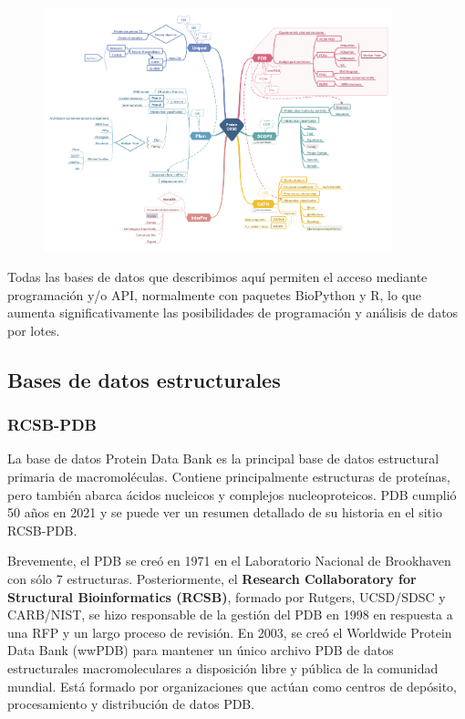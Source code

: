 \begin{figure}[h]
\centering
\includegraphics[width = 0.9\textwidth]{figs/bbdd_full.png}
\end{figure}

\begin{table}[htbp]
\begin{mdframed}[backgroundcolor=black!10]
    \centering
    Todas las bases de datos que describimos aquí permiten el acceso mediante programación y/o API, normalmente con paquetes BioPython y R, lo que aumenta significativamente las posibilidades de programación y análisis de datos por lotes.
    \end{mdframed}
\end{table}

\subsection{Bases de datos estructurales}
\subsubsection{RCSB-PDB}
La base de datos Protein Data Bank es la principal base de datos estructural primaria de macromoléculas. Contiene principalmente estructuras de proteínas, pero también abarca ácidos nucleicos y complejos nucleoproteicos. PDB cumplió 50 años en 2021 y se puede ver un resumen detallado de su historia en el sitio RCSB-PDB.

Brevemente, el PDB se creó en 1971 en el Laboratorio Nacional de Brookhaven con sólo 7 estructuras. Posteriormente, el \textbf{Research Collaboratory for Structural Bioinformatics (RCSB)}, formado por Rutgers, UCSD/SDSC y CARB/NIST, se hizo responsable de la gestión del PDB en 1998 en respuesta a una RFP y un largo proceso de revisión. En 2003, se creó el Worldwide Protein Data Bank (wwPDB) para mantener un único archivo PDB de datos estructurales macromoleculares a disposición libre y pública de la comunidad mundial. Está formado por organizaciones que actúan como centros de depósito, procesamiento y distribución de datos PDB.

